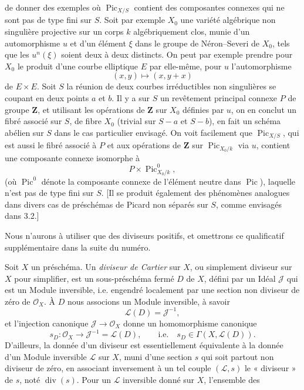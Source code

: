 de donner des exemples où $\operatorname{Pic}_{X/S}$ contient des composantes
connexes qui ne sont pas de type fini sur $S$. Soit par exemple $X_0$ une
variété algébrique non singulière projective sur un corps $k$ algébriquement
clos, munie d'un automorphisme $u$ et d'un élément $\xi$ dans le groupe de
Néron--Severi de $X_0$, tels que les $u^n(\xi)$ soient deux à deux distincts.
On peut par exemple prendre pour $X_0$ le produit d'une courbe elliptique $E$
par elle-même, pour $u$ l'automorphisme
\[
(x,y)\longmapsto(x,y+x)
\]
de $E\times E$. Soit $S$ la réunion de deux courbes irréductibles non
singulières se coupant en deux points $a$ et $b$. Il y a sur $S$ un revêtement
principal connexe $P$ de groupe $\mathbf Z$, et utilisant les opérations de
$\mathbf Z$ sur $X_0$ définies par $u$, on en conclut un fibré associé sur $S$,
de fibre $X_0$ (trivial sur $S-a$ et $S-b$), en fait un schéma abélien sur $S$
dans le cas particulier envisagé. On voit facilement que
$\operatorname{Pic}_{X/S}$, qui est aussi le fibré associé à $P$ et aux
opérations de $\mathbf Z$ sur $\operatorname{Pic}_{X_0/k}$ via $u$, contient
une composante connexe isomorphe à
\[
P\times\operatorname{Pic}^{0}_{X_0/k},
\]
(où $\operatorname{Pic}^{0}$ dénote la composante connexe de l'élément neutre
dans $\operatorname{Pic}$), laquelle n'est pas de type fini sur $S$. [Il se
produit également des phénomènes analogues dans divers cas de préschémas de
Picard non séparés sur $S$, comme envisagés dans 3.2.]


Nous n'aurons à utiliser que des diviseurs positifs, et omettrons ce
qualificatif supplémentaire dans la suite du numéro.

Soit $X$ un préschéma. Un \emph{diviseur de Cartier} sur $X$, ou simplement
diviseur sur $X$ pour simplifier, est un sous-préschéma fermé $D$ de $X$, défini
par un Idéal $\mathcal J$ qui est un Module inversible, i.e. engendré localement
par une section non diviseur de zéro de $\mathcal O_X$. À $D$ nous associons un
Module inversible, à savoir
\[
\mathcal L(D)=\mathcal J^{-1},
\]
et l'injection canonique $\mathcal J\longrightarrow\mathcal O_X$ donne un
homomorphisme canonique
\[
s_D:\mathcal O_X\longrightarrow\mathcal J^{-1}=\mathcal L(D),
\qquad\text{i.e.}\quad s_D\in\Gamma(X,\mathcal L(D)).
\]
D'ailleurs, la donnée d'un diviseur est essentiellement équivalente à la
donnée d'un Module inversible $\mathcal L$ sur $X$, muni d'une section $s$ qui
soit partout non diviseur de zéro, en associant inversement à un tel couple
$(\mathcal L,s)$ le « diviseur » de $s$, noté $\operatorname{div}(s)$. Pour un
$\mathcal L$ inversible donné sur $X$, l'ensemble des


